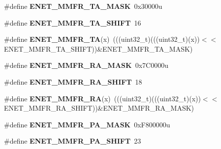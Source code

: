 \begin{DoxyCompactItemize}
\item 
\#define {\bfseries E\+N\+E\+T\+\_\+\+M\+M\+F\+R\+\_\+\+T\+A\+\_\+\+M\+A\+SK}~0x30000u\hypertarget{group__ENET__Register__Masks_gac8464f2aec3816fb4088c18ff6a85f54}{}\label{group__ENET__Register__Masks_gac8464f2aec3816fb4088c18ff6a85f54}

\item 
\#define {\bfseries E\+N\+E\+T\+\_\+\+M\+M\+F\+R\+\_\+\+T\+A\+\_\+\+S\+H\+I\+FT}~16\hypertarget{group__ENET__Register__Masks_ga9559ded561df2769ecd05aed1233943a}{}\label{group__ENET__Register__Masks_ga9559ded561df2769ecd05aed1233943a}

\item 
\#define {\bfseries E\+N\+E\+T\+\_\+\+M\+M\+F\+R\+\_\+\+TA}(x)~(((uint32\+\_\+t)(((uint32\+\_\+t)(x))$<$$<$E\+N\+E\+T\+\_\+\+M\+M\+F\+R\+\_\+\+T\+A\+\_\+\+S\+H\+I\+FT))\&E\+N\+E\+T\+\_\+\+M\+M\+F\+R\+\_\+\+T\+A\+\_\+\+M\+A\+SK)\hypertarget{group__ENET__Register__Masks_gafa7ca4280c54ec8d167eff14acf8cac2}{}\label{group__ENET__Register__Masks_gafa7ca4280c54ec8d167eff14acf8cac2}

\item 
\#define {\bfseries E\+N\+E\+T\+\_\+\+M\+M\+F\+R\+\_\+\+R\+A\+\_\+\+M\+A\+SK}~0x7\+C0000u\hypertarget{group__ENET__Register__Masks_ga3325bdb05d05a8ec384202a6537a7f9f}{}\label{group__ENET__Register__Masks_ga3325bdb05d05a8ec384202a6537a7f9f}

\item 
\#define {\bfseries E\+N\+E\+T\+\_\+\+M\+M\+F\+R\+\_\+\+R\+A\+\_\+\+S\+H\+I\+FT}~18\hypertarget{group__ENET__Register__Masks_gacb92c97e6dc7b0e466141a7f7cb63f4d}{}\label{group__ENET__Register__Masks_gacb92c97e6dc7b0e466141a7f7cb63f4d}

\item 
\#define {\bfseries E\+N\+E\+T\+\_\+\+M\+M\+F\+R\+\_\+\+RA}(x)~(((uint32\+\_\+t)(((uint32\+\_\+t)(x))$<$$<$E\+N\+E\+T\+\_\+\+M\+M\+F\+R\+\_\+\+R\+A\+\_\+\+S\+H\+I\+FT))\&E\+N\+E\+T\+\_\+\+M\+M\+F\+R\+\_\+\+R\+A\+\_\+\+M\+A\+SK)\hypertarget{group__ENET__Register__Masks_ga8279a64d4827ed6f212bb99f7904bc13}{}\label{group__ENET__Register__Masks_ga8279a64d4827ed6f212bb99f7904bc13}

\item 
\#define {\bfseries E\+N\+E\+T\+\_\+\+M\+M\+F\+R\+\_\+\+P\+A\+\_\+\+M\+A\+SK}~0x\+F800000u\hypertarget{group__ENET__Register__Masks_ga94bdc2ca69bff166783ef7c044c025b4}{}\label{group__ENET__Register__Masks_ga94bdc2ca69bff166783ef7c044c025b4}

\item 
\#define {\bfseries E\+N\+E\+T\+\_\+\+M\+M\+F\+R\+\_\+\+P\+A\+\_\+\+S\+H\+I\+FT}~23\hypertarget{group__ENET__Register__Masks_gaf0551254f9579ac5acce7a3d8d22d808}{}\label{group__ENET__Register__Masks_gaf0551254f9579ac5acce7a3d8d22d808}


\end{DoxyCompactItemize}
